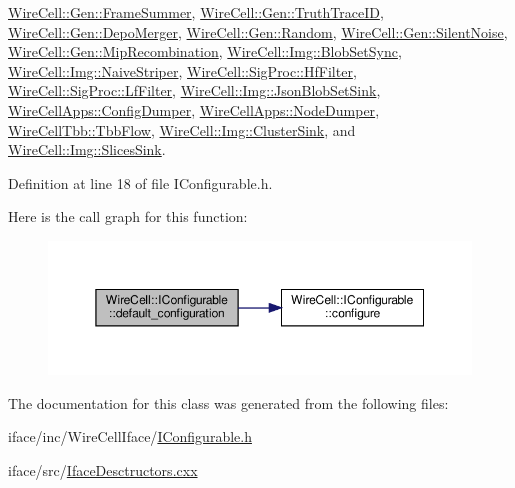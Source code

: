 \hyperlink{class_wire_cell_1_1_gen_1_1_frame_summer_ac811b308e2f01644e04401aa3982f583}{Wire\+Cell\+::\+Gen\+::\+Frame\+Summer}, \hyperlink{class_wire_cell_1_1_gen_1_1_truth_trace_i_d_a315b5e6491134d84248cfc2ed8f8e0b1}{Wire\+Cell\+::\+Gen\+::\+Truth\+Trace\+ID}, \hyperlink{class_wire_cell_1_1_gen_1_1_depo_merger_aeff369792193398df64bbc9bd90bdbab}{Wire\+Cell\+::\+Gen\+::\+Depo\+Merger}, \hyperlink{class_wire_cell_1_1_gen_1_1_random_a52d481cf1def8ba466faa65fc20529ef}{Wire\+Cell\+::\+Gen\+::\+Random}, \hyperlink{class_wire_cell_1_1_gen_1_1_silent_noise_adb72fd47827c62cb4a6634545fd62f87}{Wire\+Cell\+::\+Gen\+::\+Silent\+Noise}, \hyperlink{class_wire_cell_1_1_gen_1_1_mip_recombination_aeef16da2540f00fb156d5d7506d27449}{Wire\+Cell\+::\+Gen\+::\+Mip\+Recombination}, \hyperlink{class_wire_cell_1_1_img_1_1_blob_set_sync_a2a1fa199a9e012d6bee50061f2381609}{Wire\+Cell\+::\+Img\+::\+Blob\+Set\+Sync}, \hyperlink{class_wire_cell_1_1_img_1_1_naive_striper_abec6eadf74638aa14d86442bc23e2a7a}{Wire\+Cell\+::\+Img\+::\+Naive\+Striper}, \hyperlink{class_wire_cell_1_1_sig_proc_1_1_hf_filter_a490d55260745515290505cef11ca8ff1}{Wire\+Cell\+::\+Sig\+Proc\+::\+Hf\+Filter}, \hyperlink{class_wire_cell_1_1_sig_proc_1_1_lf_filter_a1a6475fbf1b682840d50b653f86915ca}{Wire\+Cell\+::\+Sig\+Proc\+::\+Lf\+Filter}, \hyperlink{class_wire_cell_1_1_img_1_1_json_blob_set_sink_acb989524a514c9d69cd2c6ce523eb2aa}{Wire\+Cell\+::\+Img\+::\+Json\+Blob\+Set\+Sink}, \hyperlink{class_wire_cell_apps_1_1_config_dumper_ad35cbc138044fd7a491402c54b0b9e50}{Wire\+Cell\+Apps\+::\+Config\+Dumper}, \hyperlink{class_wire_cell_apps_1_1_node_dumper_add7457528e1b13ef4bd3cb9331ee5911}{Wire\+Cell\+Apps\+::\+Node\+Dumper}, \hyperlink{class_wire_cell_tbb_1_1_tbb_flow_a8dacc14b5763a06f06e508aff481b9d2}{Wire\+Cell\+Tbb\+::\+Tbb\+Flow}, \hyperlink{class_wire_cell_1_1_img_1_1_cluster_sink_a78a90dd617b3aad0933c1d0f8fc055a7}{Wire\+Cell\+::\+Img\+::\+Cluster\+Sink}, and \hyperlink{class_wire_cell_1_1_img_1_1_slices_sink_a90643c1f80defa08566ee3b1d6592768}{Wire\+Cell\+::\+Img\+::\+Slices\+Sink}.



Definition at line 18 of file I\+Configurable.\+h.

Here is the call graph for this function\+:
\nopagebreak
\begin{figure}[H]
\begin{center}
\leavevmode
\includegraphics[width=350pt]{class_wire_cell_1_1_i_configurable_a54841b2da3d1ea02189478bff96f7998_cgraph}
\end{center}
\end{figure}


The documentation for this class was generated from the following files\+:\begin{DoxyCompactItemize}
\item 
iface/inc/\+Wire\+Cell\+Iface/\hyperlink{_i_configurable_8h}{I\+Configurable.\+h}\item 
iface/src/\hyperlink{_iface_desctructors_8cxx}{Iface\+Desctructors.\+cxx}\end{DoxyCompactItemize}
